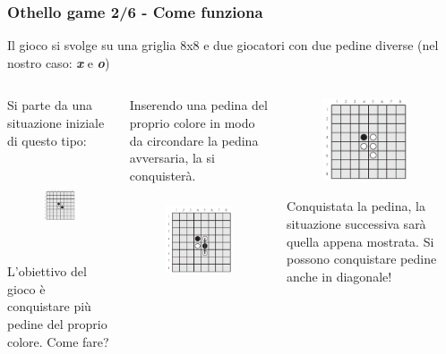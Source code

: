 \documentclass{beamer}
\begin{document}
\begin{frame}[fragile]
\frametitle{Othello game 2/6 - Come funziona}
Il gioco si svolge su una griglia 8x8 e due giocatori con due pedine diverse (nel nostro caso: \textit{\textbf{x}} e \textit{\textbf{o}})
\begin{columns}
	\begin{column}[T]{0.3\textwidth}
		\begin{center}
			Si parte da una situazione iniziale di questo tipo:		
		\begin{figure}[t]
			\includegraphics[height=2.5cm, width=2.5cm]{images/ReverseGame1.png}
		\end{figure}
			L'obiettivo del gioco è conquistare più pedine del proprio colore. Come fare?
		\end{center}
	
	\end{column}
	\begin{column}[T]{0.3\textwidth}
		\begin{center}
			Inserendo una pedina del proprio colore in modo da circondare la pedina avversaria, la si conquisterà.
		\begin{figure}[t]
			\includegraphics[height=2.5cm, width=2.5cm]{images/ReverseGame2.png}
		\end{figure}
		\end{center}
	\end{column}
	\begin{column}[T]{0.3\textwidth}
		\begin{center}
		\begin{figure}[t]
			\includegraphics[height=2.5cm, width=2.5cm]{images/ReverseGame3.png}
		\end{figure}
		Conquistata la pedina, la situazione successiva sarà quella appena mostrata. Si possono conquistare pedine anche in diagonale!
	\end{center}
	\end{column}
\end{columns}

\end{frame}
\end{document}
